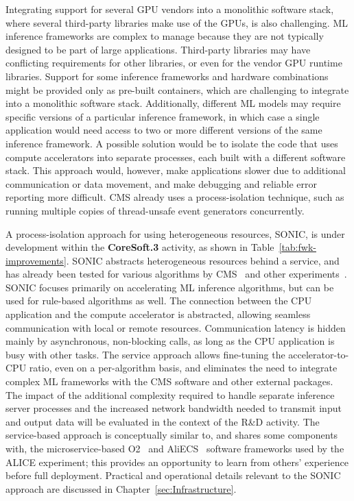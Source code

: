 Integrating support for several \gls{GPU} vendors into a monolithic software stack, where several third-party libraries make use of the \glspl{GPU}, is also challenging. \gls{ML} inference frameworks are complex to manage because they are not typically designed to be part of large applications. Third-party libraries may have conflicting requirements for other libraries, or even for the vendor \gls{GPU} runtime libraries. Support for some inference frameworks and hardware combinations might be provided only as pre-built containers, which are challenging to integrate into a monolithic software stack. Additionally, different \gls{ML} models may require specific versions of a particular inference framework, in which case a single application would need access to two or more different versions of the same inference framework. A possible solution would be to isolate the code that uses compute accelerators into separate processes, each built with a different software stack. This approach would, however, make applications slower due to additional communication or data movement, and make debugging and reliable error reporting more difficult. CMS already uses a process-isolation technique, such as running multiple copies of thread-unsafe event generators concurrently. 

A process-isolation approach for using heterogeneous resources, \gls{SONIC}, is under development within the \textbf{CoreSoft.3} activity, as shown in Table~\ref{tab:fwk-improvements}. \gls{SONIC} abstracts heterogeneous resources behind a service, and has already been tested for various algorithms by CMS~\cite{Duarte:2019fta,Rankin:2020usv,Krupa:2020bwg,CMS:2024twn} and other experiments~\cite{Wang:2020fjr,Cai:2023ldc}. \gls{SONIC} focuses primarily on accelerating \gls{ML} inference algorithms, but can be used for rule-based algorithms as well. The connection between the \gls{CPU} application and the compute accelerator is abstracted, allowing seamless communication with local or remote resources. Communication latency is hidden mainly by asynchronous, non-blocking calls, as long as the \gls{CPU} application is busy with other tasks. The service approach allows fine-tuning the accelerator-to-\gls{CPU} ratio, even on a per-algorithm basis, and eliminates the need to integrate complex \gls{ML} frameworks with the CMS software and other external packages. The impact of the additional complexity required to handle separate inference server processes and the increased network bandwidth needed to transmit input and output data will be evaluated in the context of the R\&D activity. The service-based approach is conceptually similar to, and shares some components with, the microservice-based O2~\cite{Buncic:2011297} and AliECS~\cite{Mrnjavac:2020axm} software frameworks used by the ALICE experiment; this provides an opportunity to learn from others’ experience before full deployment. Practical and operational details relevant to the \gls{SONIC} approach are discussed in Chapter~\ref{sec:Infrastructure}.

